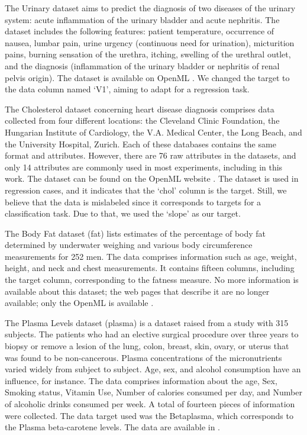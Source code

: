 \documentclass{article}
\theoremstyle{plain}
\theoremstyle{definition}
\theoremstyle{remark}
\begin{document}
The Urinary dataset \cite{czerniak2003application} aims to predict the diagnosis of two diseases of the urinary system: acute inflammation of the urinary bladder and acute nephritis. The dataset includes the following features: patient temperature, occurrence of nausea, lumbar pain, urine urgency (continuous need for urination), micturition pains, burning sensation of the urethra, itching, swelling of the urethral outlet, and the diagnosis (inflammation of the urinary bladder or nephritis of renal pelvis origin). The dataset is available on OpenML \cite{openml_1455}. We changed the target to the data column named `V1', aiming to adapt for a regression task. 

The Cholesterol dataset \cite{Detrano1989} concerning heart disease diagnosis comprises data collected from four different locations: the Cleveland Clinic Foundation, the Hungarian Institute of Cardiology, the V.A. Medical Center, the Long Beach, and the University Hospital, Zurich. Each of these databases contains the same format and attributes. However, there are 76 raw attributes in the datasets, and only 14 attributes are commonly used in most experiments, including in this work. The dataset can be found on the OpenML website \cite{OpenMLheart}. The dataset is used in regression cases, and it indicates that the `chol' column is the target. Still, we believe that the data is mislabeled since it corresponds to targets for a classification task. Due to that, we used the `slope' as our target.

The Body Fat dataset (fat)  lists estimates of the percentage of body fat determined by underwater weighing and various body circumference measurements for 252 men. The data comprises information such as age,	weight, height, and neck and chest measurements. It contains fifteen columns, including the target column, corresponding to the fatness measure. No more information is available about this dataset; the web pages that describe it are no longer available; only the OpenML is available \cite{OpenML560}.

The  Plasma Levels dataset (plasma) \cite{Nierenberg1989} is a dataset raised from a study with 315 subjects. The patients who had an elective surgical procedure over three years to biopsy or remove a lesion of the lung, colon, breast, skin, ovary, or uterus that was found to be non-cancerous. Plasma concentrations of the micronutrients varied widely from subject to subject. Age, sex, and alcohol consumption have an influence, for instance. The data comprises information about the age, Sex, Smoking status, Vitamin Use, Number of calories consumed per day, and Number of alcoholic drinks consumed per week. A total of fourteen pieces of information were collected. The data target used was the Betaplasma, which corresponds to the Plasma beta-carotene levels. The data are available in \cite{OpenML511}.
\end{document}
